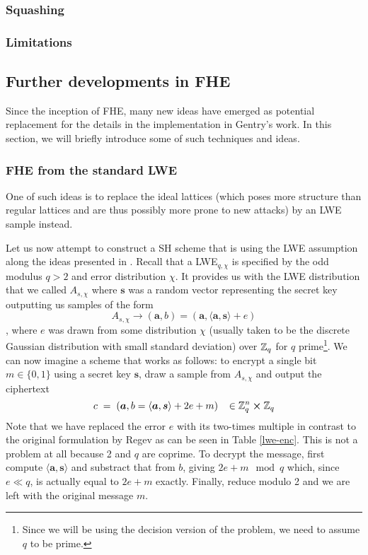 \subsubsection{Squashing}
\subsubsection{Limitations}

\subsection{Further developments in FHE}
Since the inception of FHE, many new ideas have emerged as potential replacement for the details in the implementation in Gentry's work. In this section, we will briefly introduce some of such techniques and ideas.

\subsubsection{FHE from the standard LWE}
 One of such ideas is to replace the ideal lattices (which poses more structure than regular lattices and are thus possibly more prone to new attacks) by an LWE sample instead.


 Let us now attempt to construct a SH scheme that is using the LWE assumption along the ideas presented in \cite{fhe-lwe}. Recall that a LWE$_{q, \chi}$ is specified by the odd modulus $q > 2$ and error distribution $\chi$. It provides us with the LWE distribution that we called $A_{s, \chi}$ where $\bm{s}$ was a random vector representing the secret key outputting us samples of the form
\[A_{s, \chi} \rightarrow (\bm{a}, b) = (\bm{a}, \langle \bm{a}, \bm{s} \rangle + e)\],
where $e$ was drawn from some distribution $\chi$ (usually taken to be the discrete Gaussian distribution with small standard deviation) over $\mathbb{Z}_q$ for $q$ prime\footnote{Since we will be using the decision version of the problem, we need to assume $q$ to be prime.}. We can now imagine a scheme that works as follows: to encrypt a single bit $m \in \{0,1\}$ using a secret key $\bm{s}$, draw a sample from $A_{s, \chi}$ and output the ciphertext
\[ c \; = \; (\boldsymbol{a}, b = \langle \boldsymbol{a}, \boldsymbol{s} \rangle +2e +m) \; \; \; \in \mathbb{Z}_q^n \cross \mathbb{Z}_q \]
Note that we have replaced the error $e$ with its two-times multiple in contrast to the original formulation by Regev as can be seen in Table \ref{lwe-enc}. This is not a problem at all because 2 and $q$ are coprime. To decrypt the message, first compute $\langle \bm{a},\bm{s} \rangle$ and substract that from $b$, giving $2e + m \mod q$ which, since $e \ll q$, is actually equal to $2e +m$ exactly. Finally, reduce modulo 2 and we are left with the original message $m$.

